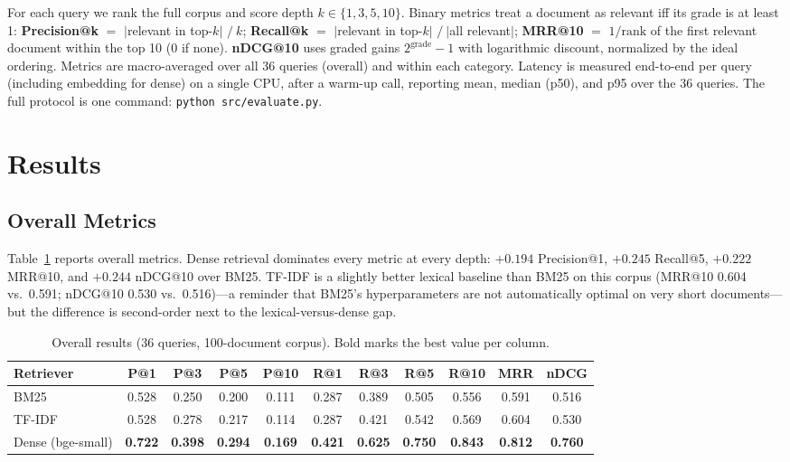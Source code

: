 \documentclass[11pt,a4paper]{article}
\newcommand{\code}[1]{\texttt{#1}}
\begin{document}
For each query we rank the full corpus and score depth $k \in \{1, 3, 5, 10\}$. Binary metrics treat a document as relevant iff its grade is at least 1: \textbf{Precision@k} $=$ $|$relevant in top-$k$$|$ $/\ k$; \textbf{Recall@k} $=$ $|$relevant in top-$k$$|$ $/\ |$all relevant$|$; \textbf{MRR@10} $=$ $1/\text{rank}$ of the first relevant document within the top 10 (0 if none). \textbf{nDCG@10} uses graded gains $2^{\text{grade}} - 1$ with logarithmic discount, normalized by the ideal ordering. Metrics are macro-averaged over all 36 queries (overall) and within each category. Latency is measured end-to-end per query (including embedding for dense) on a single CPU, after a warm-up call, reporting mean, median (p50), and p95 over the 36 queries. The full protocol is one command: \code{python src/evaluate.py}.

\section{Results}\label{sec:results}

\subsection{Overall Metrics}

Table~\ref{tab:overall} reports overall metrics. Dense retrieval dominates every metric at every depth: $+0.194$ Precision@1, $+0.245$ Recall@5, $+0.222$ MRR@10, and $+0.244$ nDCG@10 over BM25. TF-IDF is a slightly better lexical baseline than BM25 on this corpus (MRR@10 0.604 vs.\ 0.591; nDCG@10 0.530 vs.\ 0.516)---a reminder that BM25's hyperparameters are not automatically optimal on very short documents---but the difference is second-order next to the lexical-versus-dense gap.

\begin{table}[htbp]
\centering
\caption{Overall results (36 queries, 100-document corpus). Bold marks the best value per column.}
\label{tab:overall}
\footnotesize
\setlength{\tabcolsep}{5pt}
\begin{tabular*}{\columnwidth}{@{\extracolsep{\fill}} l cccccccccc}
\toprule
Retriever & P@1 & P@3 & P@5 & P@10 & R@1 & R@3 & R@5 & R@10 & MRR & nDCG \\
\midrule
BM25 & 0.528 & 0.250 & 0.200 & 0.111 & 0.287 & 0.389 & 0.505 & 0.556 & 0.591 & 0.516 \\
TF-IDF & 0.528 & 0.278 & 0.217 & 0.114 & 0.287 & 0.421 & 0.542 & 0.569 & 0.604 & 0.530 \\
Dense (bge-small) & \textbf{0.722} & \textbf{0.398} & \textbf{0.294} & \textbf{0.169} & \textbf{0.421} & \textbf{0.625} & \textbf{0.750} & \textbf{0.843} & \textbf{0.812} & \textbf{0.760} \\
\bottomrule
\end{tabular*}
\end{table}
\end{document}
